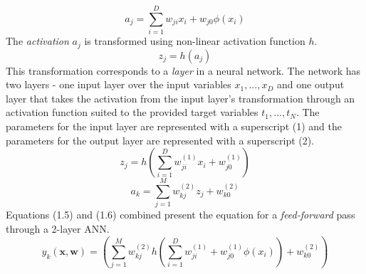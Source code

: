 \begin{equation}
    a_j = \sum_{i=1}^{D} w_{ji}x_i + w_{j0} \phi\left(x_i\right)
\end{equation}
The \textit{activation} $a_j$  is transformed using non-linear activation function $h$.
\begin{equation}
    z_j = h\left(a_j\right)
\end{equation}
This transformation corresponds to a \textit{layer} in a neural network. The network has two layers - one input layer over the input variables $x_1, ..., x_D$  and one output layer that takes the activation from the input layer's transformation through an activation function suited to the provided target variables $t_1,...,t_N$. The parameters for the input layer are represented with a superscript (1) and the parameters for the output layer are represented with a superscript (2).
\begin{equation}
    z_j = h\left( \sum_{i=1}^{D} w_{ji}^{(1)}x_i + w_{j0}^{(1)} \right)
\end{equation}
\begin{equation}
     a_k = \sum_{j=1}^{M} w_{kj}^{(2)}z_j + w_{k0}^{(2)} 
\end{equation}
Equations (1.5) and (1.6) combined present the equation for a \textit{feed-forward} pass through a 2-layer ANN.
\begin{equation}
    y_{k}(\mathbf{x}, \mathbf{w}) =  \left( \sum_{j=1}^{M}  w_{kj}^{(2)}h \left( \sum_{i=1}^{D} w_{ji}^{(1)} + w_{j0}^{(1)} \phi\left(x_i\right)\right) + w_{k0}^{(2)} \right)
\end{equation}


 
% 

